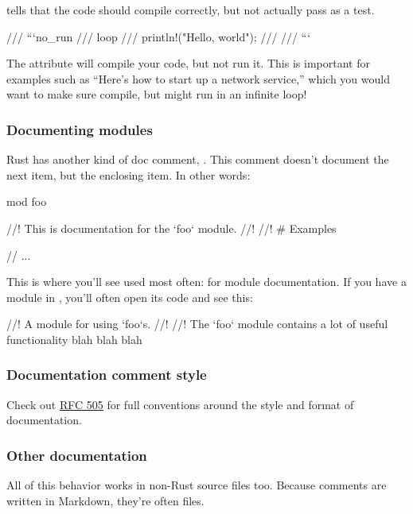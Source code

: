  tells  that the code should compile correctly, but not actually pass as a test.

\begin{rustc}
/// ```no_run
/// loop {
///     println!("Hello, world");
/// }
/// ```
\end{rustc}

The  attribute will compile your code, but not run it. This is important for examples such as \enquote{Here's how to 
start up a network service,} which you would want to make sure compile, but might run in an infinite loop!

\subsubsection*{Documenting modules}

Rust has another kind of doc comment, \code{//!}. This comment doesn't document the next item, but the enclosing item. In other words:

\begin{rustc}
mod foo {
    //! This is documentation for the `foo` module.
    //!
    //! # Examples

    // ...
}
\end{rustc}

This is where you'll see \code{//!} used most often: for module documentation. If you have a module in , you'll often 
open its code and see this:

\begin{rustc}
//! A module for using `foo`s.
//!
//! The `foo` module contains a lot of useful functionality blah blah blah
\end{rustc}

\subsubsection*{Documentation comment style}

Check out \href{https://github.com/rust-lang/rfcs/blob/master/text/0505-api-comment-conventions.md}{RFC 505} for full conventions 
around the style and format of documentation.

\subsubsection*{Other documentation}

All of this behavior works in non-Rust source files too. Because comments are written in Markdown, they're often  files.


